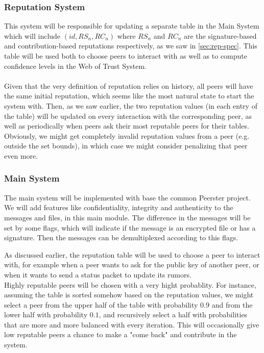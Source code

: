 \documentclass[]{article}
\begin{document}
\subsubsection{Reputation System}
This system will be responsible for updating a separate table in the Main System which will include $(id, RS_n, RC_n)$ where $RS_n$ and $RC_n$ are the signature-based and contribution-based reputations respectively, as we saw in \ref{sec:rep-spec}.
This table will be used both to choose peers to interact with as well as to compute confidence levels in the Web of Trust System.
\\\\
Given that the very definition of reputation relies on history, all peers will have the same initial reputation, which seems like the most natural state to start the system with.
Then, as we saw earlier, the two reputation values (in each entry of the table) will be updated on every interaction with the corresponding peer, as well as periodically when peers ask their most reputable peers for their tables.
\\
Obviously, we might get completely invalid reputation values from a peer (e.g. outside the set bounds), in which case we might consider penalizing that peer even more.

\subsubsection{Main System}
The main system will be implemented with base the common Peerster project. \\
We will add features like confidentiality, integrity and authenticity to the messages and files, in this main module. The difference in the messages will be set by some flags, which will indicate if the message is an encrypted file or has a signature. Then the messages can be demultiplexed according to this flags.

As discussed earlier, the reputation table will be used to choose a peer to interact with, for example when a peer wants to ask for the public key of another peer, or when it wants to send a status packet to update its rumors.
\\
Highly reputable peers will be chosen with a very hight probablity. For instance, assuming the table is sorted somehow based on the reputation values, we might select a peer from the upper half of the table with probability $0.9$ and from the lower half with probability $0.1$, and recursively select a half with probabilities that are more and more balanced with every iteration.
This will occasionally give low reputable peers a chance to make a "come back" and contribute in the system.
\end{document}
